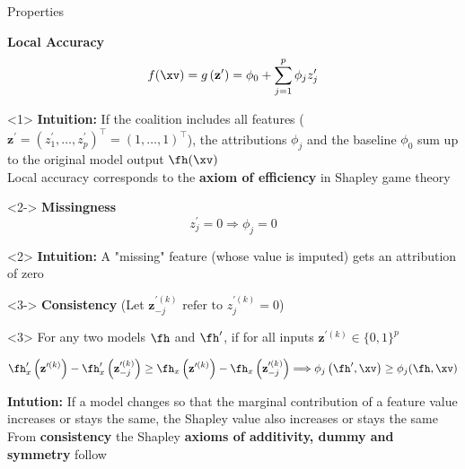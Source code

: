 \documentclass[11pt,compress,t,notes=noshow, aspectratio=169, xcolor=table]{beamer}
\begin{document}
\begin{frame}{Properties}

\textbf{Local Accuracy}
$$
f(\xv)=g\left(\mathbf{z}^{\prime}\right)=\phi_{0}+\sum_{j=1}^{p} \phi_{j} z_{j}^{\prime}
$$

\begin{onlyenv}<1>
\textbf{Intuition:} If the coalition includes all features ($\mathbf{z}^{\prime} = (z^{\prime}_1, \dots, z^{\prime}_p)^\top = (1, \dots, 1)^\top $), the attributions $\phi_j$ and the baseline $\phi_0$ sum up to the original model output $\fh(\xv)$\\\medskip
Local accuracy corresponds to the \textbf{axiom of efficiency} in Shapley game theory

\end{onlyenv}

\begin{onlyenv}<2->
\textbf{Missingness}
$$
z_{j}^{\prime}=0 \Longrightarrow \phi_{j}=0
$$
\end{onlyenv}

\begin{onlyenv}<2>
\textbf{Intuition:}  A "missing" feature (whose value is imputed) gets an attribution of zero
\end{onlyenv}

\begin{onlyenv}<3->
\textbf{Consistency} (Let $\mathbf{z}^{\prime (k)}_{-j} \text{ refer to } z_{j}^{\prime (k)}=0$) \\
\end{onlyenv}

\begin{onlyenv}<3>
For any two models $\fh$ and $\fh^{\prime}$, if for all inputs $\mathbf{z}^{\prime (k)} \in \{0, 1\}^p$

$$
\fh_{x}^{\prime}\left(\mathbf{z}^{\prime (k)}\right)-\fh_{x}^{\prime}\left(\mathbf{z}^{\prime (k)}_{-j}\right) \geq \fh_{x}\left(\mathbf{z}^{\prime (k)}\right)-\fh_{x}\left(\mathbf{z}^{\prime (k)} _{-j}\right) \Longrightarrow \phi_{j}\left(\fh^{\prime}, \xv\right) \geq \phi_{j}(\fh, \xv)
$$

\textbf{Intution:} If a model changes so that the marginal contribution of a feature value increases or stays the same, the Shapley value also increases or stays the same\\\medskip
From \textbf{consistency} the Shapley \textbf{axioms of additivity, dummy and symmetry} follow
\end{onlyenv}


\end{frame}

\endlecture
\end{document}
